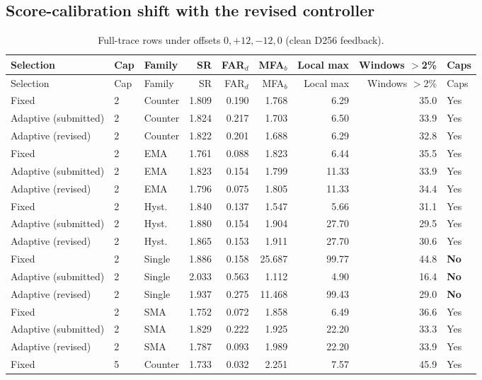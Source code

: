 \subsection{Score-calibration shift with the revised controller}
{\footnotesize\setlength{\tabcolsep}{4pt}
\begin{longtable}{lllrrrrrl}
\caption{Full-trace rows under offsets $0,+12,-12,0$ (clean D256 feedback).}\label{tab:s7_shift}\\
\toprule
Selection & Cap & Family & SR & FAR$_d$ & MFA$_b$ & Local max & Windows $>$2\% & Caps\\
\midrule
\endfirsthead
\toprule
Selection & Cap & Family & SR & FAR$_d$ & MFA$_b$ & Local max & Windows $>$2\% & Caps\\
\midrule
\endhead
\bottomrule
\endfoot
Fixed & 2 & Counter & 1.809 & 0.190 & 1.768 & 6.29 & 35.0 & Yes\\
Adaptive (submitted) & 2 & Counter & 1.824 & 0.217 & 1.703 & 6.50 & 33.9 & Yes\\
Adaptive (revised) & 2 & Counter & 1.822 & 0.201 & 1.688 & 6.29 & 32.8 & Yes\\
Fixed & 2 & EMA & 1.761 & 0.088 & 1.823 & 6.44 & 35.5 & Yes\\
Adaptive (submitted) & 2 & EMA & 1.823 & 0.154 & 1.799 & 11.33 & 33.9 & Yes\\
Adaptive (revised) & 2 & EMA & 1.796 & 0.075 & 1.805 & 11.33 & 34.4 & Yes\\
Fixed & 2 & Hyst. & 1.840 & 0.137 & 1.547 & 5.66 & 31.1 & Yes\\
Adaptive (submitted) & 2 & Hyst. & 1.880 & 0.154 & 1.904 & 27.70 & 29.5 & Yes\\
Adaptive (revised) & 2 & Hyst. & 1.865 & 0.153 & 1.911 & 27.70 & 30.6 & Yes\\
Fixed & 2 & Single & 1.886 & 0.158 & 25.687 & 99.77 & 44.8 & \textbf{No}\\
Adaptive (submitted) & 2 & Single & 2.033 & 0.563 & 1.112 & 4.90 & 16.4 & \textbf{No}\\
Adaptive (revised) & 2 & Single & 1.937 & 0.275 & 11.468 & 99.43 & 29.0 & \textbf{No}\\
Fixed & 2 & SMA & 1.752 & 0.072 & 1.858 & 6.49 & 36.6 & Yes\\
Adaptive (submitted) & 2 & SMA & 1.829 & 0.222 & 1.925 & 22.20 & 33.3 & Yes\\
Adaptive (revised) & 2 & SMA & 1.787 & 0.093 & 1.989 & 22.20 & 33.9 & Yes\\
Fixed & 5 & Counter & 1.733 & 0.032 & 2.251 & 7.57 & 45.9 & Yes\\

\end{longtable}}
